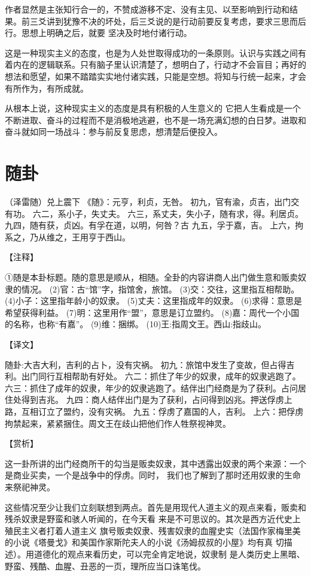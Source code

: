 \documentclass[12pt,UTF8]{ctexbook}
\begin{document}
作者显然是主张知行合一的，不赞成游移不定、没有主见、以至影响到行动和结果。前三爻讲到犹豫不决的坏处，后三爻说的是行动前要反复考虑，要求三思而后行。思想上明确之后，就要 坚决及时地付诸行动。

这是一种现实主义的态度，也是为人处世取得成功的一条原则。认识与实践之间有着内在的逻辑联系。只有脑子里认识清楚了，想明白了，行动才不会盲目；再好的想法和愿望，如果不踏踏实实地付诸实践，只能是空想。将知与行统一起来，才会有所作为，有所成就。

从根本上说，这种现实主义的态度是具有积极的人生意义的 它把人生看成是一个不断进取、奋斗的过程而不是消极地逃避，也不是一场充满幻想的白日梦。进取和奋斗就如同一场战斗：参与前反复思虑，想清楚后便投入。

\chapter{随卦}

（泽雷随）兑上震下
《随》：元亨，利贞，无咎。
初九，官有渝，贞吉，出门交有功。
六二，系小子，失丈夫。
六三，系丈夫，失小子，随有求，得。利居贞。
九四，随有获，贞凶。有孚在道，以明，何咎？古
九五，孚于嘉，吉。
上六，拘系之，乃从维之，王用亨于西山。

【注释】

①随是本卦标题。随的意思是顺从，相随。全卦的内容讲商人出门做生意和贩卖奴隶的情况。
(2)官：古“馆”字，指馆舍，旅馆。
(3)交：交往，这里指互相帮助。
(4)小子：这里指年龄小的奴隶。
(5)丈夫：这里指成年的奴隶。
(6)求得：意思是希望获得利益。
(7)明：这里用作“盟”，意思是订立盟约。
(8)嘉：周代一个小国的名称，也称“有嘉”。
(9)维：捆绑。
(10)王:指周文王。西山:指歧山。

【译文】

随卦:大吉大利，吉利的占卜，没有灾祸。
初九：旅馆中发生了变故，但占得吉利。出门同行互相帮助有好处。
六二：抓住了年少的奴隶，成年的奴隶逃跑了。
六三：抓住了成年的奴隶，年少的奴隶逃跑了。结伴出门经商是为了获利。占问居住处得到吉兆。
九四：商人结伴出门是为了获利，占问得到凶兆。押送俘虏上路，互相订立了盟约，没有灾祸。
九五：俘虏了嘉国的人，吉利。
上六：把俘虏拘禁起来，紧紧捆住。周文王在歧山把他们作人牲祭视神灵。

【赏析】

这一卦所讲的出门经商所干的勾当是贩卖奴隶，其中透露出奴隶的两个来源：一个是商业买卖，一个是战争中的俘虏。同时， 我们也了解到了那时还用奴隶的生命来祭祀神灵。

这些情况至少让我们立刻联想到两点。首先是用现代人道主义的观点来看，贩卖和残杀奴隶是野蛮和骇人听闻的，在今天看 来是不可思议的。其次是西方近代史上殖民主义者打着人道主义 旗号贩卖奴隶、残害奴隶的血腥史实（法国作家梅里美的小说《塔曼戈》和美国作家斯陀夫人的小说《汤姆叔叔的小屋》均有真 切描述）。用道德化的观点来看历史，可以完全肯定地说，奴隶制 是人类历史上黑暗、野蛮、残酷、血腥、丑恶的一页，理所应当口诛笔伐。
\end{document}
